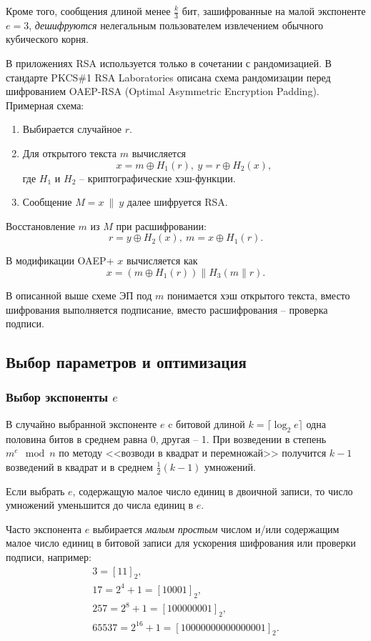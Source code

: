 Кроме того, сообщения длиной менее $\frac{k}{3}$ бит, зашифрованные на малой экспоненте $e=3$, \emph{дешифруются} нелегальным пользователем извлечением обычного кубического корня.

В приложениях RSA используется только в сочетании с рандомизацией. В стандарте PKCS\#1 RSA Laboratories описана схема рандомизации перед шифрованием OAEP-RSA (Optimal Asymmetric Encryption Padding). Примерная схема:
\begin{enumerate}
    \item Выбирается случайное $r$.
    \item Для открытого текста $m$ вычисляется
        \[ x = m \oplus H_1(r), ~ y = r \oplus H_2(x), \]
        где $H_1$ и $H_2$ -- криптографические хэш-функции.
    \item Сообщение $M = x ~\|~ y$ далее шифруется RSA.
\end{enumerate}
Восстановление $m$ из $M$ при расшифровании:
    \[ r = y \oplus H_2(x), ~ m = x \oplus H_1(r). \]

В модификации OAEP+ $x$ вычисляется как
    \[ x = (m \oplus H_1(r)) \| H_3(m \| r). \]

В описанной выше схеме ЭП под $m$ понимается хэш открытого текста, вместо шифрования выполняется подписание, вместо расшифрования -- проверка подписи.


\subsection{Выбор параметров и оптимизация}

\subsubsection{Выбор экспоненты $e$}

В случайно выбранной экспоненте $e$ c битовой длиной $k = \lceil \log_2 e \rceil$ одна половина битов в среднем равна 0, другая -- 1. При возведении в степень $m^e \mod n$ по методу <<возводи в квадрат и перемножай>> получится $k-1$ возведений в квадрат и в среднем
 $\frac{1}{2}(k-1)$ умножений.

Если выбрать $e$, содержащую малое число единиц в двоичной записи, то число умножений уменьшится до числа единиц в $e$.

Часто экспонента $e$ выбирается \emph{малым} \emph{простым} числом и/или содержащим малое число единиц в битовой записи для ускорения шифрования или проверки подписи, например:
\[
    \begin{array}{l}
        3 = [11]_2, \\
        17 = 2^4+1 = [10001]_2, \\
        257 = 2^8+1 = [100000001]_2, \\
        65537 = 2^{16}+1 = [10000000000000001]_2.
    \end{array}
\]

